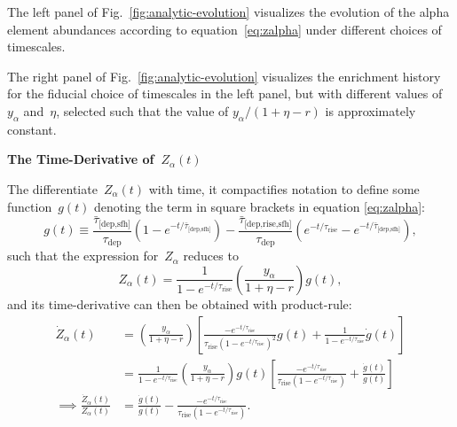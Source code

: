 \documentclass[12pt]{article}
\newcommand{\timescale}[1]{\ensuremath{\tau_\text{#1}}}
\newcommand{\harmonic}[2]{\ensuremath{\bar{\tau}_\text{[#1,#2]}}}
\newcommand{\hharmonic}[3]{\ensuremath{\bar{\tau}_\text{[#1,#2,#3]}}}
\begin{document}
The left panel of Fig.~\ref{fig:analytic-evolution} visualizes the evolution of
the alpha element abundances according to equation~\ref{eq:zalpha} under
different choices of timescales.
\par
The right panel of Fig.~\ref{fig:analytic-evolution} visualizes the enrichment
history for the fiducial choice of timescales in the left panel, but with
different values of~$y_\alpha$ and~$\eta$, selected such that the value of
$y_\alpha / (1 + \eta - r)$ is approximately constant.
\par\null\par\noindent
\textbf{The Time-Derivative of~$Z_\alpha(t)$}
\par\noindent
The differentiate~$Z_\alpha(t)$ with time, it compactifies notation to define
some function~$g(t)$ denoting the term in square brackets in equation
\ref{eq:zalpha}:
\begin{equation}
g(t) \equiv \frac{\harmonic{dep}{sfh}}{\timescale{dep}}
\left(1 - e^{-t / \harmonic{dep}{sfh}}\right) -
\frac{\hharmonic{dep}{rise}{sfh}}{\timescale{dep}}
\left(e^{-t / \timescale{rise}} - e^{-t / \harmonic{dep}{sfh}}\right),
\label{eq:g}
\end{equation}
such that the expression for~$Z_\alpha$ reduces to
\begin{equation}
Z_\alpha(t) = \frac{1}{1 - e^{-t / \timescale{rise}}}
\left(\frac{y_\alpha}{1 + \eta - r}\right) g(t),
\end{equation}
and its time-derivative can then be obtained with product-rule:
\begin{subequations}\begin{align}
\dot{Z}_\alpha(t) &= \left(\frac{y_\alpha}{1 + \eta - r}\right)\left[
\frac{
	-e^{-t / \timescale{rise}}
}{
	\timescale{rise} \left(1 - e^{-t / \timescale{rise}}\right)^2
} g(t) + \frac{1}{1 - e^{-t / \timescale{rise}}} \dot{g}(t)
\right]
\label{eq:zdotalpha}
\\
&= \frac{1}{1 - e^{-t / \timescale{rise}}}
\left(\frac{y_\alpha}{1 + \eta - r}\right) g(t)
\left[
\frac{
	-e^{-t / \timescale{rise}}
}{
	\timescale{rise} \left(1 - e^{-t / \timescale{rise}}\right)
} + \frac{\dot{g}(t)}{g(t)}\right]
\\
\implies \frac{\dot{Z}_\alpha(t)}{Z_\alpha(t)} &=
\frac{\dot{g}(t)}{g(t)} - \frac{
	-e^{-t / \timescale{rise}}
}{
	\timescale{rise} \left(1 - e^{-t / \timescale{rise}}\right)
}.
\label{eq:zdotalpha_over_zalpha}
\end{align}\end{subequations}
\end{document}
